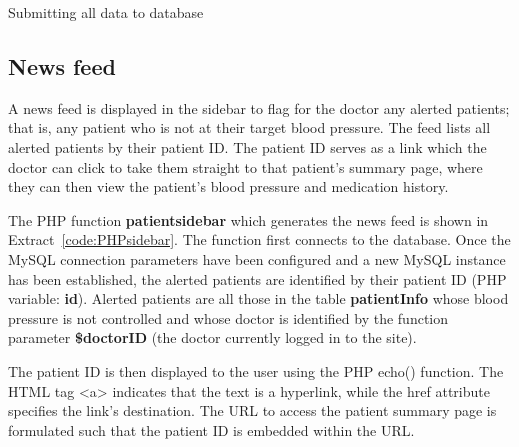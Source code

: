 \documentclass[11pt]{article}
\begin{document}
\begin{enumerate}
\begin{code}[ht]
\caption{Submitting all data to database}
\label{code:submitAll}
\end{code}


\end{enumerate}

\subsection{News feed}
A news feed is displayed in the sidebar to flag for the doctor any alerted patients; that is, any patient who is not at their target blood pressure. The feed lists all alerted patients by their patient ID. The patient ID serves as a link which the doctor can click to take them straight to that patient's summary page, where they can then view the patient's blood pressure and medication history. 

The PHP function \textbf{patientsidebar} which generates the news feed is shown in Extract~\ref{code:PHPsidebar}. The function first connects to the database. Once the MySQL connection parameters have been configured and a new MySQL instance has been established, the alerted patients are identified by their patient ID (PHP variable: \textbf{id}). Alerted patients are all those in the table \textbf{patientInfo} whose blood pressure is not controlled and whose doctor is identified by the function parameter \textbf{\$doctorID} (the doctor currently logged in to the site).

The patient ID is then displayed to the user using the PHP echo() function. The HTML tag <a> indicates that the text is a hyperlink, while the href attribute specifies the link's destination. The URL to access the patient summary page is formulated such that the patient ID is embedded within the URL.
\end{document}
